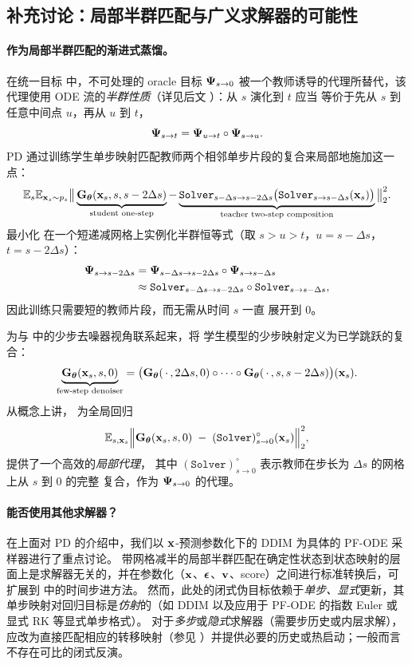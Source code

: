 \subsection{补充讨论：局部半群匹配与广义求解器的可能性}


\paragraph{作为局部半群匹配的渐进式蒸馏。}
在统一目标  中，不可处理的 oracle
目标 ${\bm{\Psi}}_{s\to 0}$ 被一个教师诱导的代理所替代，该代理使用
ODE 流的\emph{半群性质}（详见后文 ）：从 $s$ 演化到 $t$ 应当
等价于先从 $s$ 到任意中间点 $u$，再从 $u$ 到 $t$，
\[
{\bm{\Psi}}_{s\to t} = {\bm{\Psi}}_{u\to t}\circ{\bm{\Psi}}_{s\to u}.
\]
PD 通过训练学生单步映射匹配教师两个相邻单步片段的复合来局部地施加这一点：
\begin{align}\label{eq:pd-local}
  \mathbb{E}_{s}\mathbb{E}_{{\mathbf{x}}_s\sim p_s}
  \big\|
    \underbrace{{\mathbf{G}}_{{\bm{\theta}}}({\mathbf{x}}_s, s, s-2\Delta s)}_{\text{student one-step}}
    -
    \underbrace{\mathtt{Solver}_{s-\Delta s\to s-2\Delta s}\big(\mathtt{Solver}_{s\to s-\Delta s}({\mathbf{x}}_s)\big)}_{\text{teacher two-step composition}}
  \big\|_2^2.
\end{align}
最小化  在一个短递减网格上实例化半群恒等式（取 $s>u>t$，$u=s-\Delta s$，$t=s-2\Delta s$）：
\begin{align*}
  {\bm{\Psi}}_{s\to s-2\Delta s}
  &= {\bm{\Psi}}_{s-\Delta s\to s-2\Delta s}\circ{\bm{\Psi}}_{s\to s-\Delta s}
  \\&\approx
  \mathtt{Solver}_{s-\Delta s\to s-2\Delta s}\circ \mathtt{Solver}_{s\to s-\Delta s},
\end{align*}
因此训练只需要短的教师片段，而无需从时间 $s$ 一直
展开到 $0$。

为与  中的少步去噪器视角联系起来，将
学生模型的少步映射定义为已学跳跃的复合：
\[
\underbrace{{\mathbf{G}}_{{\bm{\theta}}}({\mathbf{x}}_s, s, 0)}_{\text{few-step denoiser}}
=
\big({\mathbf{G}}_{{\bm{\theta}}}(\,\cdot\,, 2\Delta s, 0)\circ\cdots\circ {\mathbf{G}}_{{\bm{\theta}}}(\,\cdot\,, s, s-2\Delta s)\big)({\mathbf{x}}_s).
\]
从概念上讲， 为全局回归
\[
\mathbb{E}_{s,{\mathbf{x}}_s}\Big\|{\mathbf{G}}_{{\bm{\theta}}}({\mathbf{x}}_s,s,0)\;-\;(\mathtt{Solver})^{\circ}_{s\to 0}({\mathbf{x}}_s)\Big\|_2^2,
\]
提供了一个高效的\emph{局部代理}，
其中 $(\mathtt{Solver})^{\circ}_{s\to 0}$ 表示教师在步长为 $\Delta s$ 的网格上从 $s$ 到 $0$ 的完整
复合，作为 ${\bm{\Psi}}_{s\to 0}$ 的代理。

\paragraph{能否使用其他求解器？}
在上面对 PD 的介绍中，我们以 ${\mathbf{x}}$-预测参数化下的 DDIM 为具体的 PF-ODE 采样器进行了重点讨论。
带网格减半的局部半群匹配在确定性状态到状态映射的层面上是求解器无关的，并在参数化（${\mathbf{x}}$、${\bm{\epsilon}}$、${\mathbf{v}}$、score）之间进行标准转换后，可扩展到  中的时间步进方法。
然而，此处的闭式伪目标依赖于\emph{单步、显式}更新，其单步映射对回归目标是\emph{仿射}的（如 DDIM 以及应用于 PF-ODE 的指数 Euler 或显式 RK 等显式单步格式）。
对于\emph{多步}或\emph{隐式}求解器（需要步历史或内层求解），应改为直接匹配相应的转移映射（参见 ）并提供必要的历史或热启动；一般而言不存在可比的闭式反演。

